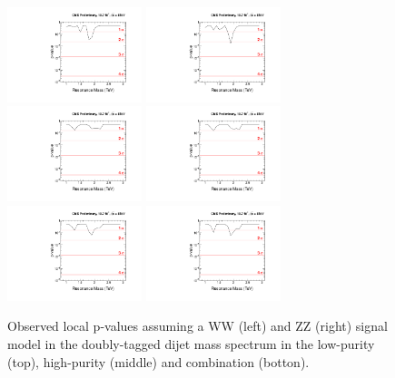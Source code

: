 \begin{figure}[h!tpb]
\begin{center}
\includegraphics[width=0.35\textwidth]{EXO-12-024/figs/limits/pvalue_RS1WW_low_purity.pdf}
\includegraphics[width=0.35\textwidth]{EXO-12-024/figs/limits/pvalue_RS1ZZ_low_purity.pdf}\\
\includegraphics[width=0.35\textwidth]{EXO-12-024/figs/limits/pvalue_RS1WW_high_purity.pdf}
\includegraphics[width=0.35\textwidth]{EXO-12-024/figs/limits/pvalue_RS1ZZ_high_purity.pdf}\\
\includegraphics[width=0.35\textwidth]{EXO-12-024/figs/limits/pvalue_RS1WW_combined.pdf}
\includegraphics[width=0.35\textwidth]{EXO-12-024/figs/limits/pvalue_RS1ZZ_combined.pdf}
\end{center}
\caption{Observed local p-values assuming a \GRS WW (left) and \GRS ZZ (right) signal model in the doubly-tagged dijet mass spectrum in the low-purity (top), high-purity (middle) and combination (botton).}
\label{fig:Vtagresults5}
\end{figure}

